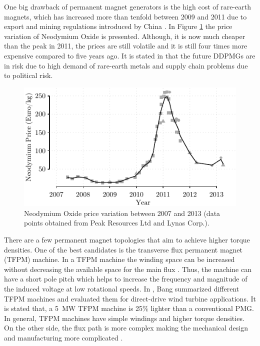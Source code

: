 \documentclass[a4paper, 11pt]{article} %
\begin{document}
One big drawback of permanent magnet generators is the high cost of rare-earth magnets, which has increased more than tenfold between 2009 and 2011 due to export and mining regulations introduced by China  \cite{rareearthelements}. In Figure \ref{neodymium_price} the price variation of Neodymium Oxide is presented. Although, it is now much cheaper than the peak in 2011, the prices are still volatile and it is still four times more expensive compared to five years ago. It is stated in \cite{Moss2011} that the future DDPMGs are in risk due to high demand of rare-earth metals  and supply chain problems due to political risk.  

\begin{figure}[]
\centering
\includegraphics[]{neodymium_price}
\caption{Neodymium Oxide price variation between 2007 and 2013 (data points obtained from Peak Resources Ltd and Lynas Corp.).}
\label{neodymium_price}
\end{figure}

There are a few permanent magnet topologies that aim to achieve higher torque densities. One of the best candidates is the transverse flux permanent magnet (TFPM) machine. In a TFPM machine the winding space can be increased without decreasing the available space for the main flux \cite{Bang2010}. Thus, the machine can have a short pole pitch which helps to increase the frequency and magnitude of the induced voltage at low rotational speeds. In \cite{Bang2010}, Bang summarized different TFPM machines and evaluated them for direct-drive wind turbine applications. It is stated that, a 5~MW TFPM machine is  25\% lighter than a conventional PMG. In general, TFPM machines have simple windings and higher torque densities. On the other side, the flux path is more complex making the mechanical design and manufacturing more complicated \cite{Bang2009,Bang2008}.
\end{document}
